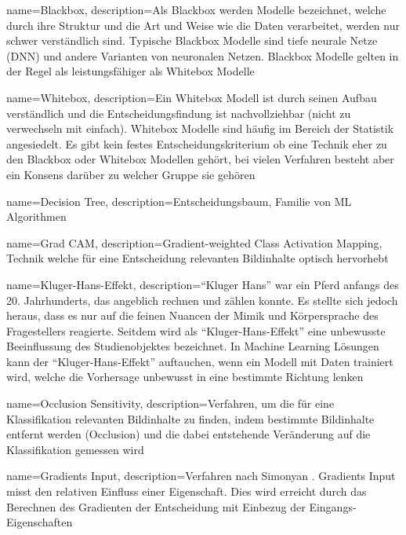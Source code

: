 {
	name=Blackbox,
	description={Als Blackbox werden Modelle bezeichnet, welche durch ihre Struktur und die Art und Weise wie die Daten verarbeitet, werden nur schwer verständlich sind. Typische Blackbox Modelle sind tiefe neurale Netze (DNN) und andere Varianten von neuronalen Netzen. Blackbox Modelle gelten in der Regel als leistungsfähiger als Whitebox Modelle}                                   
}     

{
	name=Whitebox,
	description={Ein Whitebox Modell ist durch seinen Aufbau verständlich und die Entscheidungsfindung ist nachvollziehbar (nicht zu verwechseln mit einfach). Whitebox Modelle sind häufig im Bereich der Statistik angesiedelt. Es gibt kein festes Entscheidungskriterium ob eine Technik eher zu den Blackbox oder Whitebox Modellen gehört, bei vielen Verfahren besteht aber ein Konsens darüber zu welcher Gruppe sie gehören}                                   
}     

{
	name=Decision Tree,
	description={Entscheidungsbaum, Familie von ML Algorithmen}                                   
}     

{
	name=Grad CAM,
	description={Gradient-weighted Class Activation Mapping, Technik welche für eine Entscheidung relevanten Bildinhalte optisch hervorhebt}  
}

{
	name=Kluger-Hans-Effekt,
	description={``Kluger Hans'' war ein Pferd anfangs des 20. Jahrhunderts, das angeblich rechnen und zählen konnte. Es stellte sich jedoch heraus, dass es nur auf  die feinen Nuancen der Mimik und Körpersprache des Fragestellers reagierte. Seitdem wird als ``Kluger-Hans-Effekt'' eine unbewusste Beeinflussung des Studienobjektes bezeichnet. In Machine Learning Lösungen kann der ``Kluger-Hans-Effekt'' auftauchen, wenn ein Modell mit Daten trainiert wird, welche die Vorhersage unbewusst in eine bestimmte Richtung lenken}  
}

{
	name=Occlusion Sensitivity,
	description={Verfahren, um die für eine Klassifikation relevanten Bildinhalte zu finden, indem bestimmte Bildinhalte entfernt werden (Occlusion) und die dabei entstehende Veränderung auf die Klassifikation gemessen wird}  
}

{
	name=Gradients Input,
	description={Verfahren nach Simonyan \parencite{Simonyan2013}. Gradients Input misst den relativen Einfluss einer Eigenschaft. Dies wird erreicht durch das Berechnen des Gradienten der Entscheidung mit Einbezug der Eingangs-Eigenschaften}  
}

